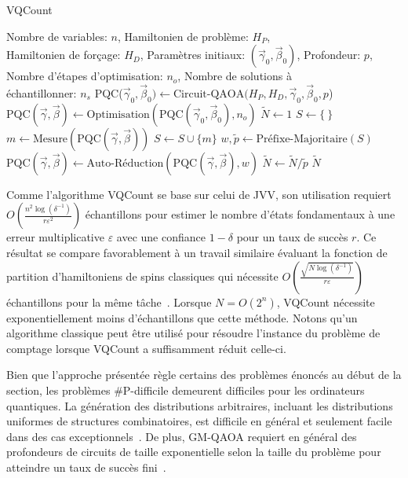 \begin{algorithm}[ht!]
    \caption{VQCount}\label{alg:vqcount}
    \begin{algorithmic}[1]
    \REQUIRE Nombre de variables: $n$, Hamiltonien de problème: $H_P$,\\Hamiltonien de forçage: $H_D$, Paramètres initiaux: $(\vec{\gamma}_0, \vec{\beta}_0)$, Profondeur: $p$, Nombre d'étapes d'optimisation: $n_{o}$, Nombre de solutions à\\échantillonner: $n_s$
    \STATE PQC($\vec{\gamma}_0, \vec{\beta}_0) \leftarrow \text{Circuit-QAOA}(H_P, H_D, \vec{\gamma}_0, \vec{\beta}_0, p$)
    \STATE $\text{PQC}(\vec{\gamma}, \vec{\beta}) \leftarrow \text{Optimisation}(\text{PQC}(\vec{\gamma}_0, \vec{\beta}_0), n_{o})$
    \STATE $\tilde{N} \leftarrow 1$
    \STATE $S \leftarrow \{ \ \}$
    \STATE $m \leftarrow \text{Mesure}(\text{PQC}(\vec{\gamma}, \vec{\beta}))$
    \STATE $S \leftarrow S \cup \{m\}$
    \ENDIF
    \ENDWHILE
    \STATE $w, \tilde{p} \leftarrow \text{Préfixe-Majoritaire}(S)$
    \STATE $\text{PQC}(\vec{\gamma}, \vec{\beta}) \leftarrow \text{Auto-Réduction}(\text{PQC}(\vec{\gamma}, \vec{\beta}), w)$
    \STATE $\tilde{N} \leftarrow \tilde{N} / \tilde{p}$
    \ENDFOR
    \RETURN $\tilde{N}$
\end{algorithmic}
\end{algorithm}
    
Comme l'algorithme VQCount se base sur celui de JVV, son utilisation requiert $O(\frac{n^{2} \log (\delta^{-1})}{r \varepsilon^{2}})$ échantillons pour estimer le nombre d'états fondamentaux à une erreur multiplicative $\varepsilon$ avec une confiance $1 - \delta$ pour un taux de succès $r$. Ce résultat se compare favorablement à un travail similaire évaluant la fonction de partition d'hamiltoniens de spins classiques qui nécessite $O(\frac{\sqrt{N \log(\delta^{-1})}}{r \varepsilon})$ échantillons pour la même tâche~\cite{sundarQuantumAlgorithmCount2019}. Lorsque $N=O(2^{n})$, VQCount nécessite exponentiellement moins d'échantillons que cette méthode. Notons qu'un algorithme classique peut être utilisé pour résoudre l'instance du problème de comptage lorsque VQCount a suffisamment réduit celle-ci.

Bien que l'approche présentée règle certains des problèmes énoncés au début de la section, les problèmes \textsf{\#P}-difficile demeurent difficiles pour les ordinateurs quantiques. La génération des distributions arbitraires, incluant les distributions uniformes de structures combinatoires, est difficile en général et seulement facile dans des cas exceptionnels~\cite{aaronsonComputationalComplexityLinear2011, boulandComplexityVerificationQuantum2019}. De plus, GM-QAOA requiert en général des profondeurs de circuits de taille exponentielle selon la taille du problème pour atteindre un taux de succès fini~\cite{xiePerformanceUpperBound2025}. 

